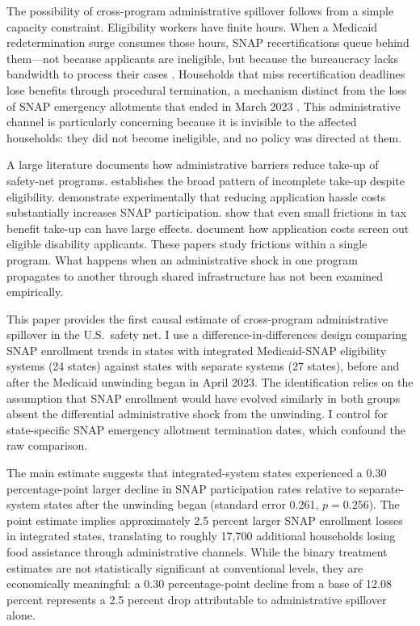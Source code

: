 \documentclass[12pt]{article}
\begin{document}
The possibility of cross-program administrative spillover follows from a simple capacity constraint. Eligibility workers have finite hours. When a Medicaid redetermination surge consumes those hours, SNAP recertifications queue behind them---not because applicants are ineligible, but because the bureaucracy lacks bandwidth to process their cases \citep{herd2015, moynihan2014}. Households that miss recertification deadlines lose benefits through procedural termination, a mechanism distinct from the loss of SNAP emergency allotments that ended in March 2023 \citep{schanzenbach2023}. This administrative channel is particularly concerning because it is invisible to the affected households: they did not become ineligible, and no policy was directed at them.

A large literature documents how administrative barriers reduce take-up of safety-net programs. \citet{currie2006} establishes the broad pattern of incomplete take-up despite eligibility. \citet{finkelstein2019} demonstrate experimentally that reducing application hassle costs substantially increases SNAP participation. \citet{bhargava2015} show that even small frictions in tax benefit take-up can have large effects. \citet{deshpande2019} document how application costs screen out eligible disability applicants. These papers study frictions within a single program. What happens when an administrative shock in one program propagates to another through shared infrastructure has not been examined empirically.

This paper provides the first causal estimate of cross-program administrative spillover in the U.S.\ safety net. I use a difference-in-differences design comparing SNAP enrollment trends in states with integrated Medicaid-SNAP eligibility systems (24 states) against states with separate systems (27 states), before and after the Medicaid unwinding began in April 2023. The identification relies on the assumption that SNAP enrollment would have evolved similarly in both groups absent the differential administrative shock from the unwinding. I control for state-specific SNAP emergency allotment termination dates, which confound the raw comparison.

The main estimate suggests that integrated-system states experienced a 0.30 percentage-point larger decline in SNAP participation rates relative to separate-system states after the unwinding began (standard error 0.261, $p = 0.256$). The point estimate implies approximately 2.5 percent larger SNAP enrollment losses in integrated states, translating to roughly 17,700 additional households losing food assistance through administrative channels. While the binary treatment estimates are not statistically significant at conventional levels, they are economically meaningful: a 0.30 percentage-point decline from a base of 12.08 percent represents a 2.5 percent drop attributable to administrative spillover alone.
\end{document}
